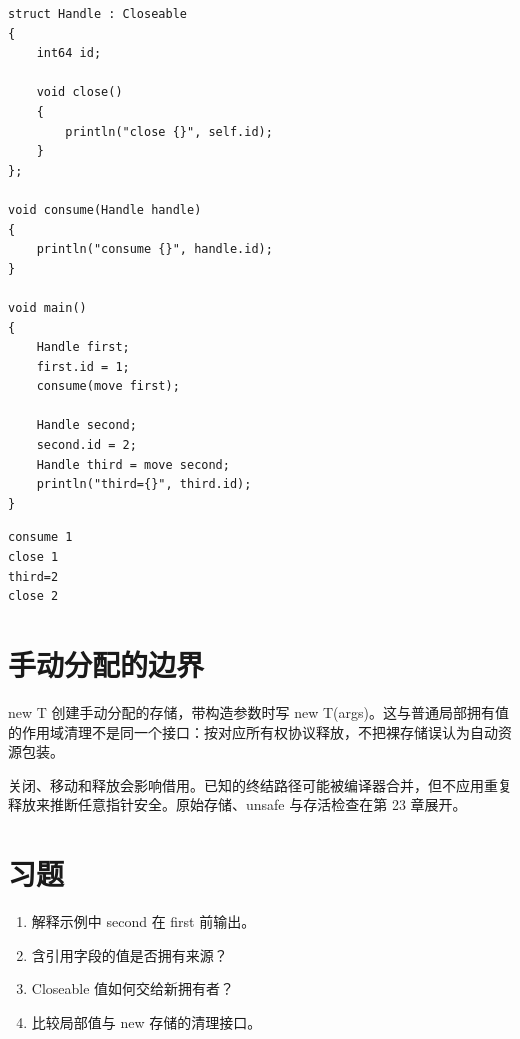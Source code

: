 \par
\medskip
\begin{lstlisting}[style=chali]
struct Handle : Closeable
{
    int64 id;

    void close()
    {
        println("close {}", self.id);
    }
};

void consume(Handle handle)
{
    println("consume {}", handle.id);
}

void main()
{
    Handle first;
    first.id = 1;
    consume(move first);

    Handle second;
    second.id = 2;
    Handle third = move second;
    println("third={}", third.id);
}
\end{lstlisting}
\par
\medskip

\par
\medskip
\begin{lstlisting}[style=out]
consume 1
close 1
third=2
close 2
\end{lstlisting}
\par
\medskip

\section{手动分配的边界}

new T 创建手动分配的存储，带构造参数时写 new T(args)。这与普通局部拥有值的作用域清理不是同一个接口：按对应所有权协议释放，不把裸存储误认为自动资源包装。

关闭、移动和释放会影响借用。已知的终结路径可能被编译器合并，但不应用重复释放来推断任意指针安全。原始存储、unsafe 与存活检查在第 23 章展开。

\section{习题}

\begin{enumerate}

\item 解释示例中 second 在 first 前输出。

\item 含引用字段的值是否拥有来源？

\item Closeable 值如何交给新拥有者？

\item 比较局部值与 new 存储的清理接口。

\end{enumerate}

